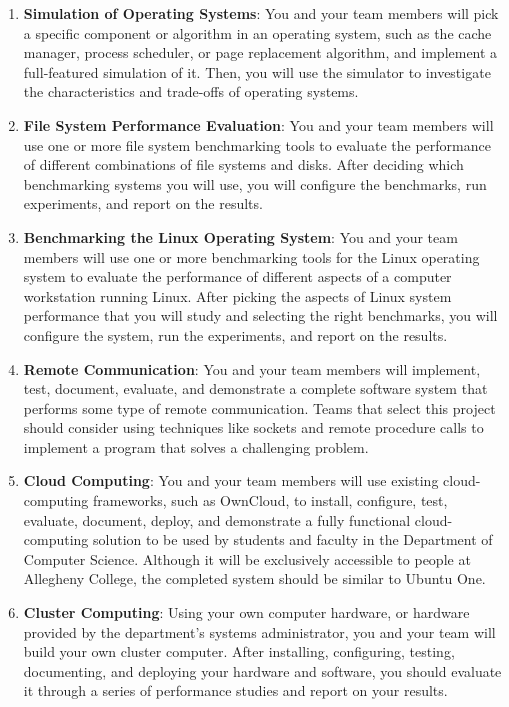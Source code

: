 \begin{enumerate}

  \item {\bf Simulation of Operating Systems}: You and your team members will pick a specific component or algorithm
    in an operating system, such as the cache manager, process scheduler, or page replacement algorithm, and implement
    a full-featured simulation of it.  Then, you will use the simulator to investigate the characteristics and
    trade-offs of operating systems.

  \item {\bf File System Performance Evaluation}: You and your team members will use one or more file system
    benchmarking tools to evaluate the performance of different combinations of file systems and disks.  After deciding
    which benchmarking systems you will use, you will configure the benchmarks, run experiments, and report on the
    results.

  \item {\bf Benchmarking the Linux Operating System}: You and your team members will use one or more benchmarking tools
    for the Linux operating system to evaluate the performance of different aspects of a computer workstation running
    Linux.  After picking the aspects of Linux system performance that you will study and selecting the right
    benchmarks, you will configure the system, run the experiments, and report on the results.

  \item {\bf Remote Communication}: You and your team members will implement, test, document, evaluate, and
    demonstrate a complete software system that performs some type of remote communication.  Teams that select this
    project should consider using techniques like sockets and remote procedure calls to implement a program that solves
    a challenging problem.

  \item {\bf Cloud Computing}: You and your team members will use existing cloud-computing frameworks, such as OwnCloud,
    to install, configure, test, evaluate, document, deploy, and demonstrate a fully functional cloud-computing solution
    to be used by students and faculty in the Department of Computer Science. Although it will be exclusively accessible
    to people at Allegheny College, the completed system should be similar to Ubuntu One.

  \item {\bf Cluster Computing}: Using your own computer hardware, or hardware provided by the department's systems
    administrator, you and your team will build your own cluster computer.  After installing, configuring, testing,
    documenting, and deploying your hardware and software, you should evaluate it through a series of performance
    studies and report on your results.


\end{enumerate}
